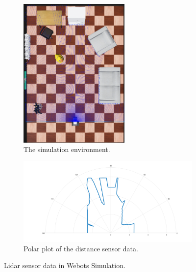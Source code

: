 \documentclass[11pt]{article}
\begin{document}
    \begin{figure}[ht!]
        \centering
        \begin{subfigure}[b]{0.3\textwidth}
            \centering
            \includegraphics[width = 0.6\textwidth]{lidar_env.PNG}
            \caption{The simulation environment.}
            \label{fig:lidar_env}
        \end{subfigure}        
        \begin{subfigure}[b]{0.4\textwidth}
            \centering
            \includegraphics[width = 1.2\textwidth]{lidar_data.png}
            \caption{Polar plot of the distance sensor data.}
            \label{fig:lidar_data}
        \end{subfigure}
        \caption{Lidar sensor data in Webots Simulation.}
        \label{fig:lidar}
    \end{figure}
\end{document}

